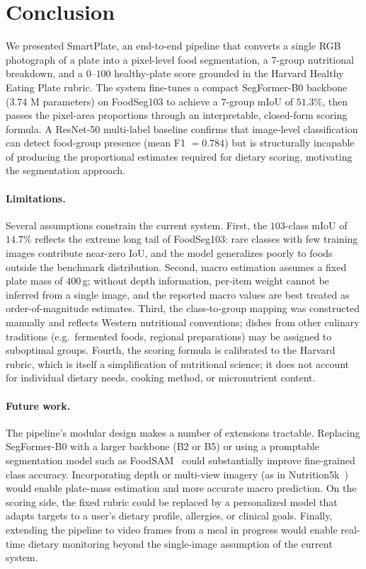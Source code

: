 \section{Conclusion}
\label{sec:conclusion}

We presented SmartPlate, an end-to-end pipeline that converts a single RGB photograph of a plate into a pixel-level food segmentation, a 7-group nutritional breakdown, and a $0$--$100$ healthy-plate score grounded in the Harvard Healthy Eating Plate rubric.
The system fine-tunes a compact SegFormer-B0 backbone (3.74 M parameters) on FoodSeg103 to achieve a $7$-group mIoU of $51.3\%$, then passes the pixel-area proportions through an interpretable, closed-form scoring formula.
A ResNet-50 multi-label baseline confirms that image-level classification can detect food-group presence (mean F1 $= 0.784$) but is structurally incapable of producing the proportional estimates required for dietary scoring, motivating the segmentation approach.

\paragraph{Limitations.}
Several assumptions constrain the current system.
First, the $103$-class mIoU of $14.7\%$ reflects the extreme long tail of FoodSeg103: rare classes with few training images contribute near-zero IoU, and the model generalizes poorly to foods outside the benchmark distribution.
Second, macro estimation assumes a fixed plate mass of $400\,$g; without depth information, per-item weight cannot be inferred from a single image, and the reported macro values are best treated as order-of-magnitude estimates.
Third, the class-to-group mapping was constructed manually and reflects Western nutritional conventions; dishes from other culinary traditions (e.g.\ fermented foods, regional preparations) may be assigned to suboptimal groups.
Fourth, the scoring formula is calibrated to the Harvard rubric, which is itself a simplification of nutritional science; it does not account for individual dietary needs, cooking method, or micronutrient content.

\paragraph{Future work.}
The pipeline's modular design makes a number of extensions tractable.
Replacing SegFormer-B0 with a larger backbone (B2 or B5) or using a promptable segmentation model such as FoodSAM~\cite{lan2023foodsam} could substantially improve fine-grained class accuracy.
Incorporating depth or multi-view imagery (as in Nutrition5k~\cite{thames2021nutrition5k}) would enable plate-mass estimation and more accurate macro prediction.
On the scoring side, the fixed rubric could be replaced by a personalized model that adapts targets to a user's dietary profile, allergies, or clinical goals.
Finally, extending the pipeline to video frames from a meal in progress would enable real-time dietary monitoring beyond the single-image assumption of the current system.
